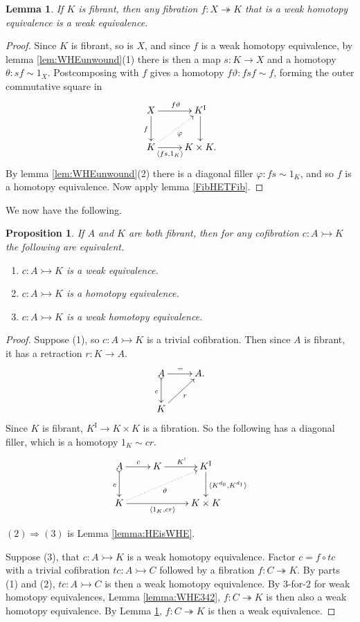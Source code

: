 \documentclass[11pt,reqno]{amsart}
\newcommand{\ra}{\ensuremath{\rightarrow}}
\newcommand{\cof}{\ensuremath{\rightarrowtail}}
\newcommand{\fib}{\ensuremath{\twoheadrightarrow}}
\renewcommand{\to}{\ensuremath{\rightarrow}}
\newcommand{\onto}{\ensuremath{\twoheadrightarrow}}
\newcommand{\I}{\ensuremath{\mathrm{I}}}
\newcommand{\pair}[1]{\ensuremath{\langle #1\rangle}}
\newtheorem{proposition}[theorem]{Proposition}
\newtheorem{lemma}[theorem]{Lemma}
\theoremstyle{remark}
\theoremstyle{definition}
\begin{document}
\begin{lemma}\label{lemma:FibWHEfibCodTFib}
If $K$ is fibrant, then any fibration $f : X \onto K$ that is a weak homotopy equivalence is a weak equivalence.
\end{lemma}
\begin{proof}
Since $K$ is fibrant, so is $X$, and since $f$ is a weak homotopy equivalence, by lemma \ref{lem:WHEunwound}(1) there is then a map $s : K\ra X$ and a homotopy $\theta: sf \sim 1_X$.  Postcomposing with $f$ gives a homotopy $f\vartheta: fsf \sim f$, forming the outer commutative square in
\[
\xymatrix{
X \ar[d]_{f} \ar[r]^{f\vartheta}  & K^\I \ar[d] \\
K \ar@{..>}[ru]_{\varphi} \ar[r]_-{\langle fs, 1_K\rangle} & K\times K.
}
\]
By lemma \ref{lem:WHEunwound}(2) there is a diagonal filler $\varphi : fs\sim 1_K$, and so $f$ is a homotopy equivalence. Now apply lemma \ref{FibHETFib}.
\end{proof}

We now have the following.

\begin{proposition}\label{prop:CofbetweenFibWEWHEHE}
If $A$ and $K$ are both fibrant, then for any cofibration $c : A \cof K$ the following are equivalent.
\begin{enumerate}
\item $c : A \cof K$ is a weak equivalence.
\item $c : A \cof K$ is a homotopy equivalence.
\item $c : A \cof K$ is a weak homotopy equivalence.
\end{enumerate}
\end{proposition}
%
\begin{proof}
Suppose (1), so $c : A \cof K$ is a trivial cofibration.  Then since $A$ is fibrant, it has a retraction $r : K\to A$.
\begin{equation*}%
\xymatrix{
A \ar@{>->}[d]_{c} \ar[r]^= & {A}. \\
{K}\ar[ru]_r & 
}
\end{equation*}
Since $K$ is fibrant, $K^\I \to K\times K$ is a fibration. So the following has a diagonal filler, which is a homotopy $1_K \sim cr$.
\begin{equation*}%
\xymatrix{
A \ar@{>->}[d]_{c} \ar[r]^{c}  & K \ar[r]^{K^!} & K^\I  \ar[d]^{\pair{K^{d_0},K^{d_1}}} \\
K \ar[rr]_{\pair{1_K, cr}} \ar@{..>}[rru]_{\vartheta} &&  K\times K
}
\end{equation*}

$(2)\Rightarrow (3)$ is Lemma \ref{lemma:HEisWHE}.

Suppose (3), that $c : A \cof K$ is a weak homotopy equivalence.  Factor $c = f\circ tc$ with a trivial cofibration $tc : A \cof C$ followed by a  fibration $f : C \fib K$.  By parts (1) and (2), $tc : A \cof C$ is then a weak homotopy equivalence. By 3-for-2 for weak homotopy equivalences, Lemma \ref{lemma:WHE342}, $f : C \fib K$ is then also a weak homotopy equivalence. By Lemma \ref{lemma:FibWHEfibCodTFib}, $f : C \fib K$ is then a weak equivalence.
\end{proof}
\end{document}
